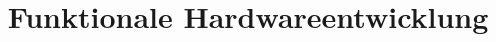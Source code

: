 \documentclass[journal]{book}
\begin{document}
\title{Funktionale Hardwareentwicklung}
\maketitle






\end{document}
